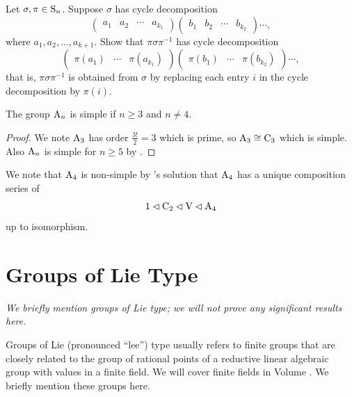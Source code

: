 \begin{exercise}\label{exercise-conjugation-of-permutation-by-another}
    Let $\sigma, \pi \in \mathrm{S}_{n}$. Suppose $\sigma$ has cycle decomposition
    \[
        \begin{pmatrix}a_1&a_2&\cdots&a_{k_1}\end{pmatrix} \begin{pmatrix}b_1&b_2&\cdots&b_{k_2}\end{pmatrix}\cdots,
    \]
    where $a_1, a_2, \dots, a_{k+1}$. Show that $\pi\sigma\pi^{-1}$ has cycle decomposition
    \[
        \begin{pmatrix}\pi(a_1)&\cdots&\pi(a_{k_1})\end{pmatrix} \begin{pmatrix}\pi(b_1)&\cdots&\pi(b_{k_2})\end{pmatrix}\cdots,
    \]
    that is, $\pi\sigma\pi^{-1}$ is obtained from $\sigma$ by replacing each entry $i$ in the cycle decomposition by $\pi(i)$.
\end{exercise}

\begin{corollary}
    The group $\mathrm{A}_{n}$ is simple if $n \geq 3$ and $n \neq 4$.
\end{corollary}
\begin{proof}
    We note $\mathrm{A}_{3}$ has order $\frac{3!}{2} = 3$ which is prime, so $\mathrm{A}_{3} \cong \mathrm{C}_{3}$ which is simple. Also $\mathrm{A}_{n}$ is simple for $n \geq 5$ by .
\end{proof}

We note that $\mathrm{A}_{4}$ is non-simple by 's solution that $\mathrm{A}_{4}$ has a unique composition series of
\[
    1 \lhd \mathrm{C}_{2} \lhd \mathrm{V} \lhd \mathrm{A}_{4}
\]
up to isomorphism.

\section{Groups of Lie Type}
\textit{We briefly mention groups of Lie type; we will not prove any significant results here.}

Groups of Lie (pronounced ``lee'') type usually refers to finite groups that are closely related to the group of rational points of a reductive linear algebraic group with values in a finite field. We will cover finite fields in Volume . We briefly mention these groups here.

